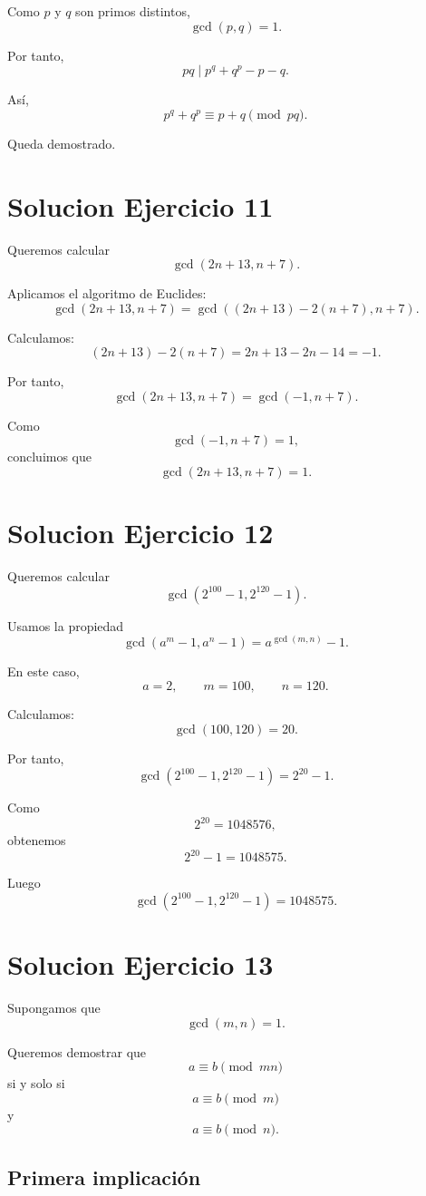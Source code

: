 \documentclass[12pt]{article}
\begin{document}
Como \(p\) y \(q\) son primos distintos,
\[
\gcd(p,q)=1.
\]

Por tanto,
\[
pq\mid p^q+q^p-p-q.
\]

Así,
\[
p^q+q^p\equiv p+q \pmod{pq}.
\]

Queda demostrado.

\section*{Solucion Ejercicio 11}

Queremos calcular
\[
\gcd(2n+13,n+7).
\]

Aplicamos el algoritmo de Euclides:
\[
\gcd(2n+13,n+7)
=
\gcd((2n+13)-2(n+7),n+7).
\]

Calculamos:
\[
(2n+13)-2(n+7)=2n+13-2n-14=-1.
\]

Por tanto,
\[
\gcd(2n+13,n+7)=\gcd(-1,n+7).
\]

Como
\[
\gcd(-1,n+7)=1,
\]
concluimos que
\[
\boxed{\gcd(2n+13,n+7)=1}.
\]

\section*{Solucion Ejercicio 12}

Queremos calcular
\[
\gcd(2^{100}-1,2^{120}-1).
\]

Usamos la propiedad
\[
\gcd(a^m-1,a^n-1)=a^{\gcd(m,n)}-1.
\]

En este caso,
\[
a=2,\qquad m=100,\qquad n=120.
\]

Calculamos:
\[
\gcd(100,120)=20.
\]

Por tanto,
\[
\gcd(2^{100}-1,2^{120}-1)=2^{20}-1.
\]

Como
\[
2^{20}=1048576,
\]
obtenemos
\[
2^{20}-1=1048575.
\]

Luego
\[
\boxed{\gcd(2^{100}-1,2^{120}-1)=1048575}.
\]

\section*{Solucion Ejercicio 13}

Supongamos que
\[
\gcd(m,n)=1.
\]

Queremos demostrar que
\[
a\equiv b \pmod{mn}
\]
si y solo si
\[
a\equiv b \pmod m
\]
y
\[
a\equiv b \pmod n.
\]

\subsection*{Primera implicación}
\end{document}
